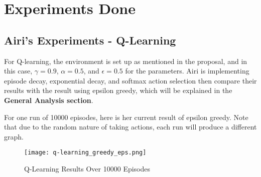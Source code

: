 \section{Experiments Done}

\subsection{Airi's Experiments - Q-Learning}




For Q-learning, the environment is set up as mentioned in the proposal, and in this case, $\gamma = 0.9$, $\alpha = 0.5$, and $\epsilon = 0.5$ for the parameters. Airi is implementing episode decay, exponential decay, and softmax action selection then compare their results with the result using epsilon greedy, which will be explained in the \textbf{General Analysis section}.

 For one run of 10000 episodes, here is her current result of epsilon greedy. Note that due to the random nature of taking actions, each run will produce a different graph.

\begin{figure}[H] %
    \centering
    \texttt{[image: q-learning\_greedy\_eps.png]}
    \caption{Q-Learning Results Over 10000 Episodes}
\end{figure}

